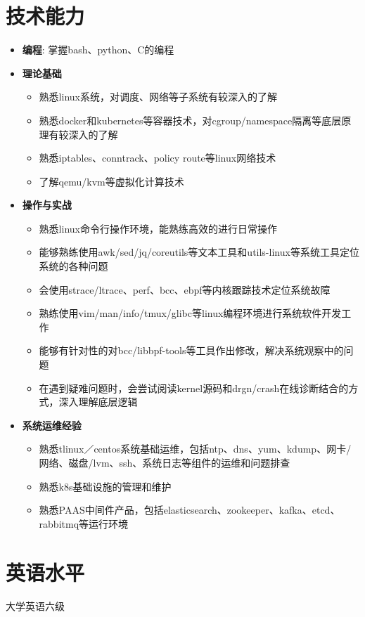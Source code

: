 \documentclass{resume}
\begin{document}
\section{技术能力}
\begin{itemize}[parsep=0.2ex]
  \item \textbf{编程}: 掌握bash、python、C的编程
  \item \textbf{理论基础}
    \begin{itemize}
      \item 熟悉linux系统，对调度、网络等子系统有较深入的了解
      \item 熟悉docker和kubernetes等容器技术，对cgroup/namespace隔离等底层原理有较深入的了解
      \item 熟悉iptables、conntrack、policy route等linux网络技术
      \item 了解qemu/kvm等虚拟化计算技术
    \end{itemize}
  \item \textbf{操作与实战}
    \begin{itemize}
      \item 熟悉linux命令行操作环境，能熟练高效的进行日常操作
      \item 能够熟练使用awk/sed/jq/coreutils等文本工具和utils-linux等系统工具定位系统的各种问题
      \item 会使用strace/ltrace、perf、bcc、ebpf等内核跟踪技术定位系统故障
      \item 熟练使用vim/man/info/tmux/glibc等linux编程环境进行系统软件开发工作
      \item 能够有针对性的对bcc/libbpf-tools等工具作出修改，解决系统观察中的问题
      \item 在遇到疑难问题时，会尝试阅读kernel源码和drgn/crash在线诊断结合的方式，深入理解底层逻辑
    \end{itemize}
  \item \textbf{系统运维经验}
    \begin{itemize}
      \item 熟悉tlinux／centos系统基础运维，包括ntp、dns、yum、kdump、网卡/网络、磁盘/lvm、ssh、系统日志等组件的运维和问题排查
      \item 熟悉k8s基础设施的管理和维护
      \item 熟悉PAAS中间件产品，包括elasticsearch、zookeeper、kafka、etcd、rabbitmq等运行环境
    \end{itemize}
\end{itemize}

\section{英语水平}
大学英语六级
\end{document}
